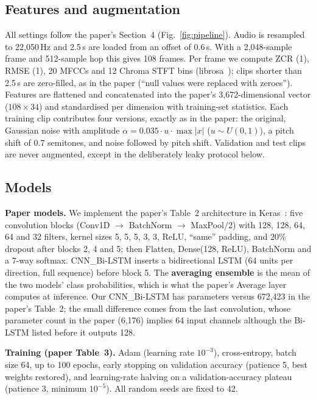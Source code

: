 \subsection{Features and augmentation}
All settings follow the paper's Section~4 (Fig.~\ref{fig:pipeline}). Audio is resampled to 22,050\,Hz and 2.5\,s are
loaded from an offset of 0.6\,s. With a 2,048-sample frame and 512-sample hop this gives 108 frames. Per frame we
compute ZCR (1), RMSE (1), 20 MFCCs and 12 Chroma STFT bins (librosa~\cite{mcfee2015librosa}); clips shorter than
2.5\,s are zero-filled, as in the paper (``null values were replaced with zeroes''). Features are flattened and
concatenated into the paper's 3,672-dimensional vector ($108 \times 34$) and standardised per dimension with
training-set statistics. Each training clip contributes four versions, exactly as in the paper: the original,
Gaussian noise with amplitude $\alpha\!=\!0.035\cdot u\cdot\max|x|$ ($u\sim U(0,1)$), a pitch shift of 0.7
semitones, and noise followed by pitch shift. Validation and test clips are never augmented, except in the
deliberately leaky protocol below.

\subsection{Models}
\textbf{Paper models.} We implement the paper's Table~2 architecture in Keras~\cite{abadi2015tensorflow}: five
convolution blocks (Conv1D $\to$ BatchNorm $\to$ MaxPool/2) with 128, 128, 64, 64 and 32 filters, kernel sizes 5, 5,
5, 3, 3, ReLU, ``same'' padding, and 20\% dropout after blocks 2, 4 and 5; then Flatten, Dense(128, ReLU),
BatchNorm and a 7-way softmax. CNN\_Bi-LSTM inserts a bidirectional LSTM (64 units per direction, full sequence)
before block 5. The \textbf{averaging ensemble} is the mean of the two models' class probabilities, which is what
the paper's Average layer computes at inference. Our CNN\_Bi-LSTM has \ParamsLstm{} parameters versus 672,423 in the
paper's Table~2; the small difference comes from the last convolution, whose parameter count in the paper
(6,176) implies 64 input channels although the Bi-LSTM listed before it outputs 128.

\textbf{Training (paper Table~3).} Adam (learning rate $10^{-3}$), cross-entropy, batch size 64, up to 100 epochs,
early stopping on validation accuracy (patience 5, best weights restored), and learning-rate halving on a
validation-accuracy plateau (patience 3, minimum $10^{-5}$). All random seeds are fixed to 42.

